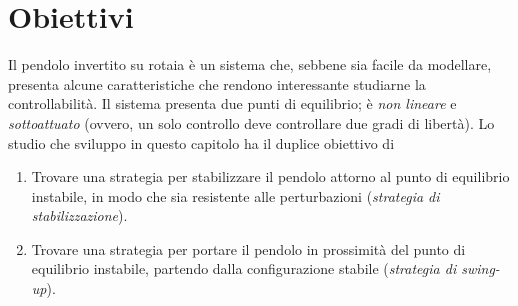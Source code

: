 \section{Obiettivi}
Il pendolo invertito su rotaia è un sistema che,
sebbene sia facile da modellare, presenta alcune
caratteristiche che rendono interessante studiarne la
controllabilità. Il sistema presenta due punti di equilibrio; è
\emph{non lineare} e \emph{sottoattuato} (ovvero, un solo controllo
deve controllare due gradi di libertà).
Lo studio che sviluppo in questo capitolo ha il duplice obiettivo di
\begin{enumerate}
    \item Trovare una strategia per stabilizzare il pendolo attorno al punto di equilibrio instabile, in modo che sia resistente alle perturbazioni (\emph{strategia di stabilizzazione}).
    \item Trovare una strategia per portare il pendolo in prossimità del punto di equilibrio instabile, partendo dalla configurazione stabile (\emph{strategia di swing-up}).
\end{enumerate}
